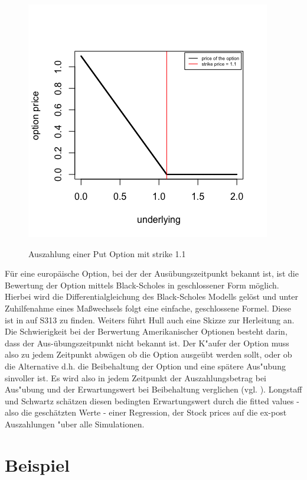 \documentclass[10pt,a4paper]{report}\usepackage[]{graphicx}\usepackage[]{color}
\begin{document}
\begin{figure}[H]
  \centering
  \includegraphics[scale=0.7]{PlotOption.png}
  \label{fig:PlotOption}
  \caption{Auszahlung einer Put Option mit strike 1.1}
\end{figure}

Für eine europäische Option, bei der der Ausübungszeitpunkt bekannt ist, ist die Bewertung der Option mittels Black-Scholes in geschlossener Form möglich. Hierbei wird die Differentialgleichung des Black-Scholes Modells gelöst und unter Zuhilfenahme eines Maßwechsels folgt eine einfache, geschlossene Formel. Diese ist in \cite{Hull} auf S313 zu finden. Weiters führt Hull auch eine Skizze zur Herleitung an.\\
Die Schwierigkeit bei der Berwertung Amerikanischer Optionen besteht darin, dass der Aus-übungszeitpunkt nicht bekannt ist. Der K"aufer der Option muss also zu jedem Zeitpunkt abwägen ob die Option ausgeübt werden sollt, oder ob die Alternative d.h. die Beibehaltung der Option und eine spätere Aus"ubung sinvoller ist. Es wird also in jedem Zeitpunkt der Auszahlungsbetrag bei Aus"ubung und der Erwartungswert bei Beibehaltung verglichen (vgl.  \cite[S.114]{schwartz2001}). Longstaff und Schwartz schätzen diesen bedingten Erwartungswert durch die \glqq fitted values \grqq - also die geschätzten Werte - einer Regression, der Stock prices auf die ex-post Auszahlungen "uber alle Simulationen.


\section{Beispiel}
\end{document}

